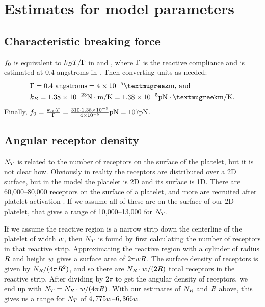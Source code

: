 \documentclass{article}
\begin{document}
\section{Estimates for model parameters}
\label{sec:estim-model-param}

\subsection{Characteristic breaking force}
\label{sec:char-break-force}

$f_0$ is equivalent to $k_BT/\Gamma$ in
\cite{Pospieszalska2009} and \cite{Sundd2011}, where $\Gamma$ is
the reactive compliance and is estimated at 0.4 angstroms in
\cite{Bhatia2003}. Then converting units as needed:
\begin{align*}
  &\compliance = 0.4 \text{ angstroms} = 4 \times 10^{-5}
    \text{{\textmugreek}m} \text{, and} \\
  &\boltzmann = 1.38 \times 10^{-23} \text{N}\cdot\text{m}/\text{K} =
    1.38 \times 10^{-5} \text{pN}\cdot\text{{\textmugreek}m}/\text{K}.
\end{align*}
Finally, $f_0 = \frac{k_B\cdot T}{\Gamma} =
\frac{310 \cdot 1.38 \times 10^{-5}}{4 \times 10^{-5}} \text{pN} = 107
\text{pN}$.

\subsection{Angular receptor density}
\label{sec:ang-rec-dens}

$N_T$ is related to the number of receptors on the
surface of the platelet, but it is not clear how. Obviously in reality
the receptors are distributed over a 2D surface, but in the model the
platelet is 2D and its surface is 1D. There are 60,000--80,000 
  receptors on the surface of a platelet, and more are
recruited after platelet activation
\cite{Shattil1998,Litvinov2011}. If we assume all of these are on the
surface of our 2D platelet, that gives a range of 10,000--13,000 for
$N_T$. 

If we assume the reactive region is a narrow strip down the centerline
of the platelet of width $w$, then $N_T$ is found by
first calculating the number of receptors in that reactive
strip. Approximating the reactive region with a cylinder of radius
$R$ and height $w$ gives a surface area of
$2\pi wR$. The surface density of receptors is given by
$N_R/(4\pi R^2)$, and so there are
$N_R\cdot w/(2R)$ total receptors in the
reactive strip. After dividing by $2\pi$ to get the angular density of
receptors, we end up with $N_T =
N_R\cdot w/(4\pi R)$. With our estimates of
$N_R$ and $R$ above, this gives us a range for
$N_T$ of $4,775w$--$6,366w$.
\end{document}
